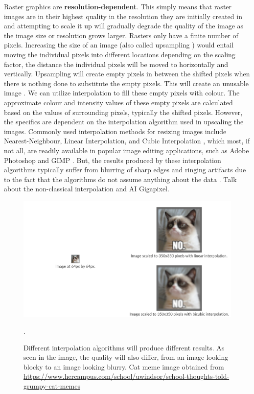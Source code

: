 Raster graphics are \textbf{resolution-dependent}. This simply means that raster images are in their highest quality in the resolution they are initially created in and attempting to scale it up will gradually degrade the quality of the image as the image size or resolution grows larger. Rasters only have a finite number of pixels. Increasing the size of an image (also called upsampling \cite{hoshyari2018perceptiondriven}) would entail moving the individual pixels into different locations depending on the scaling factor, the distance the individual pixels will be moved to horizontally and vertically. Upsampling will create empty pixels in between the shifted pixels when there is nothing done to substitute the empty pixels. This will create an unusable image \cite{resizingimages}. We can utilize interpolation to fill these empty pixels with colour. The approximate colour and intensity values of these empty pixels are calculated based on the values of surrounding pixels, typically the shifted pixels. However, the specifics are dependent on the interpolation algorithm used in upscaling the images. Commonly used interpolation methods for resizing images include Nearest-Neighbour, Linear Interpolation, and Cubic Interpolation \cite{interpolationtechniquessurvey}, which most, if not all, are readily available in popular image editing applications, such as Adobe Photoshop \cite{photoshopinterpolationmethods} and GIMP \cite{gimpinterpolationmethods}. But, the results produced by these interpolation algorithms typically suffer from blurring of sharp edges and ringing artifacts due to the fact that the algorithms do not assume anything about the data \cite{depixelizingpixelart}. Talk about the non-classical interpolation and AI Gigapixel.

\begin{figure}[h]
	\centering
	\includegraphics[scale=1.0]{images/chap01-introduction/raster-images-scaled.png}
	\caption{Different interpolation algorithms will produce different results. As seen in the image, the quality will also differ, from an image looking blocky to an image looking blurry. Cat meme image obtained from \protect\url{https://www.hercampus.com/school/uwindsor/school-thoughts-told-grumpy-cat-memes}}.
	\label{fig:raster-images-scaled}
\end{figure}


